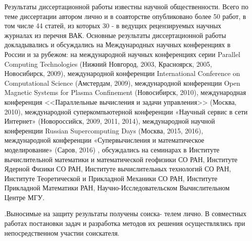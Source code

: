 Результаты диссертационной работы известны научной общественности. Всего по теме диссертации автором лично и в соавторстве опубликовано более 50 работ, в том числе 44 статей, из которых 30 - в ведущих рецензируемых научных журналах из перечня ВАК. Основные результаты диссертационной работы докладывались и обсуждались на Международных научных конференциях в России и за рубежом: на международной научных конференциях серии Parallel Computing Technologies (Нижний Новгород, 2003, Красноярск, 2005, Новосибирск, 2009), международной конференции International Conference on Computational Science (Амстердам, 2009),  международной конференции Open Magnetic Systems for Plasma Confinement (Новосибирск, 2010), международная конференция <<Параллельные вычисления и задачи управления>> (Москва, 2010), международной суперкомпьютерной конференции  «Научный сервис в сети Интернет» (Новороссийск, 2009, 2011, 2014), международной научной конференции Russian Supercomputing Days (Москва, 2015, 2016), международной конференции «Супервычисления и математическое моделирование» (Саров, 2016) , обсуждались на семинарах в Институте вычислительной математики и математической геофизики СО РАН, Институте Ядерной Физики СО РАН, Институте вычислительных технологий СО РАН, Институте Теоретической и Прикладной Механики СО РАН, Институте Прикладной Математики РАН, Научно-Исследовательском Вычислительном Центре МГУ.

{\contribution} .Выносимые на защиту результаты получены соиска-
телем лично. В совместных работах постановки задач и разработка методов их решения осуществлялись при непосредственном участии соискателя.



